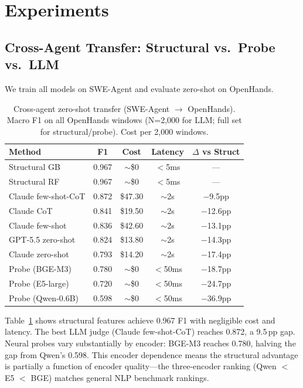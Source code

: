 \documentclass[11pt,a4paper]{article}
\begin{document}
\section{Experiments}

\subsection{Cross-Agent Transfer: Structural vs.\ Probe vs.\ LLM}
\label{sec:cross-agent}

We train all models on SWE-Agent and evaluate zero-shot on OpenHands.

\begin{table}[t]
\centering
\small
\begin{tabular}{lcccc}
\toprule
\textbf{Method} & \textbf{F1} & \textbf{Cost} & \textbf{Latency} & \textbf{$\Delta$ vs Struct} \\
\midrule
Structural GB & 0.967 & $\sim$\$0 & $<$5ms & --- \\
Structural RF & 0.967 & $\sim$\$0 & $<$5ms & --- \\
\midrule
Claude few-shot-CoT & 0.872 & \$47.30 & $\sim$2s & $-$9.5pp \\
Claude CoT & 0.841 & \$19.50 & $\sim$2s & $-$12.6pp \\
Claude few-shot & 0.836 & \$42.60 & $\sim$2s & $-$13.1pp \\
GPT-5.5 zero-shot & 0.824 & \$13.80 & $\sim$2s & $-$14.3pp \\
Claude zero-shot & 0.793 & \$14.20 & $\sim$2s & $-$17.4pp \\
\midrule
Probe (BGE-M3) & 0.780 & $\sim$\$0 & $<$50ms & $-$18.7pp \\
Probe (E5-large) & 0.720 & $\sim$\$0 & $<$50ms & $-$24.7pp \\
Probe (Qwen-0.6B) & 0.598 & $\sim$\$0 & $<$50ms & $-$36.9pp \\
\bottomrule
\end{tabular}
\caption{Cross-agent zero-shot transfer (SWE-Agent $\to$ OpenHands). Macro F1 on all OpenHands windows (N=2{,}000 for LLM; full set for structural/probe). Cost per 2{,}000 windows.}
\label{tab:cross-agent}
\end{table}

Table~\ref{tab:cross-agent} shows structural features achieve 0.967 F1 with negligible cost and latency.
The best LLM judge (Claude few-shot-CoT) reaches 0.872, a 9.5\,pp gap.
Neural probes vary substantially by encoder: BGE-M3 reaches 0.780, halving the gap from Qwen's 0.598.
This encoder dependence means the structural advantage is partially a function of encoder quality---the three-encoder ranking (Qwen $<$ E5 $<$ BGE) matches general NLP benchmark rankings.
\end{document}
